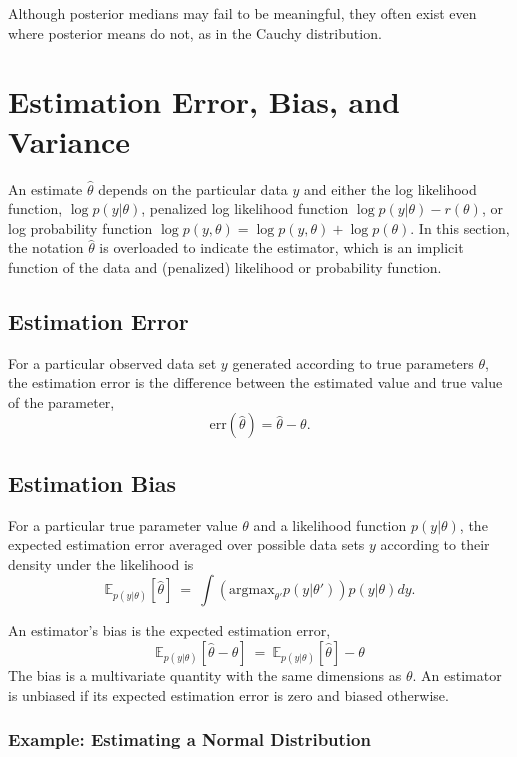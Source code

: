 Although posterior medians may fail to be meaningful, they often exist
even where posterior means do not, as in the Cauchy distribution.



\section{Estimation Error, Bias, and Variance}\label{estimation-bias.section}

An estimate $\hat{\theta}$ depends on the particular data $y$ and
either the log likelihood function, $\log p(y|\theta)$, penalized log
likelihood function $\log p(y|\theta) - r(\theta)$, or log probability
function $\log p(y,\theta) = \log p(y,\theta) + \log p(\theta)$.  In
this section, the notation $\hat{\theta}$ is overloaded to indicate
the estimator, which is an implicit function of the data and
(penalized) likelihood or probability function.

\subsection{Estimation Error}

For a particular observed data set $y$ generated according to true
parameters $\theta$, the estimation error is the difference between
the estimated value and true value of the parameter,
\[
\mbox{err}(\hat{\theta}) = \hat{\theta} - \theta.
\]
%

\subsection{Estimation Bias}

For a particular true parameter value $\theta$ and a likelihood
function $p(y|\theta)$, the expected estimation error averaged over
possible data sets $y$ according to their density under the likelihood
is
%
\[
\mathbb{E}_{p(y|\theta)}[\hat{\theta}]
\ = \
\int \left( \mbox{argmax}_{\theta'} p(y|\theta') \right) p(y|\theta) dy.
\]

An estimator's bias is the expected estimation error,
%
\[
\mathbb{E}_{p(y|\theta)}[\hat{\theta} - \theta]
\ = \
\mathbb{E}_{p(y|\theta)}[\hat{\theta}] - \theta
\]
%
The bias is a multivariate quantity with the same dimensions as
$\theta$.  An estimator is unbiased if its expected estimation error
is zero and biased otherwise.

\subsubsection{Example: Estimating a Normal Distribution}

